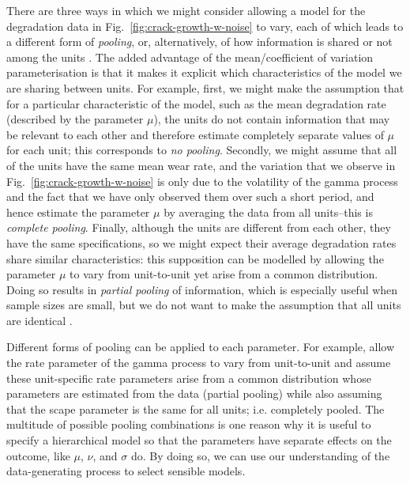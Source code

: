 There are three ways in which we might consider allowing a model for the degradation data in Fig.~\ref{fig:crack-growth-w-noise} to vary, each of which leads to a different form of \emph{pooling}, or, alternatively, of how information is shared or not among the units \citep{Johnson_2022}. The added advantage of the mean/coefficient of variation parameterisation is that it makes it explicit which characteristics of the model we are sharing between units. For example, first, we might make the assumption that for a particular characteristic of the model, such as the mean degradation rate (described by the parameter $\mu$), the units do not contain information that may be relevant to each other and therefore estimate completely separate values of $\mu$ for each unit; this corresponds to \emph{no pooling}. Secondly, we might assume that all of the units have the same mean wear rate, and the variation that we observe in Fig.~\ref{fig:crack-growth-w-noise} is only due to the volatility of the gamma process and the fact that we have only observed them over such a short period, and hence estimate the parameter $\mu$ by averaging the data from all units--this is \emph{complete pooling}. Finally, although the units are different from each other, they have the same specifications, so we might expect their average degradation rates share similar characteristics: this supposition can be modelled by allowing the parameter $\mu$ to vary from unit-to-unit yet arise from a common distribution. Doing so results in \emph{partial pooling} of information, which is especially useful when sample sizes are small, but we do not want to make the assumption that all units are identical \cite[Section~13.1]{McElreath_2020}.

Different forms of pooling can be applied to each parameter. For example, \citet{lawless2004} allow the rate parameter of the gamma process to vary from unit-to-unit and assume these unit-specific rate parameters arise from a common distribution whose parameters are estimated from the data (partial pooling) while also assuming that the scape parameter is the same for all units; i.e. completely pooled. The multitude of possible pooling combinations is one reason why it is useful to specify a hierarchical model so that the parameters have separate effects on the outcome, like $\mu$, $\nu$, and $\sigma$ do. By doing so, we can use our understanding of the data-generating process to select sensible models.

